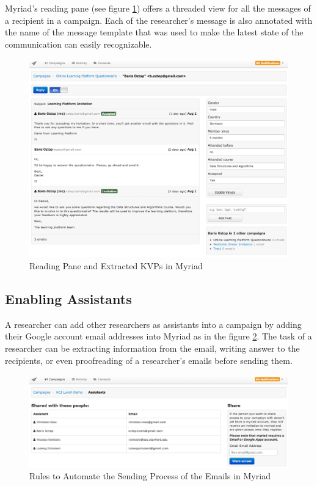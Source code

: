 Myriad's reading pane (see figure \ref{fig:MyriadReadingPane}) offers a threaded view for all the messages of a recipient in a campaign. Each of the researcher's message is also annotated with the name of the message template that was used to make the latest state of the communication can easily recognizable.

\begin{figure}[htbp]
	\centering
	\includegraphics[width=1.00\textwidth]{imgs/MyriadReadingPane.png}
	\caption[Reading Pane and Extracted \ac{KVP}s in Myriad]{Reading Pane and Extracted \ac{KVP}s in Myriad}
	\label{fig:MyriadReadingPane}
\end{figure}

\subsection{Enabling Assistants}
\label{subsec:5.2.6:EnabAssi}

A researcher can add other researchers as assistants into a campaign by adding their Google account email addresses into Myriad as in the figure \ref{fig:AddAssistants}. The task of a researcher can be extracting information from the email, writing answer to the recipients, or even proofreading of a researcher's emails before sending them.

\begin{figure}[htbp]
	\centering
	\includegraphics[width=1.00\textwidth]{imgs/AddAssistants.png}
	\caption[Rules to Automate the Sending Process of the Emails in Myriad]{Rules to Automate the Sending Process of the Emails in Myriad}
	\label{fig:AddAssistants}
\end{figure}

